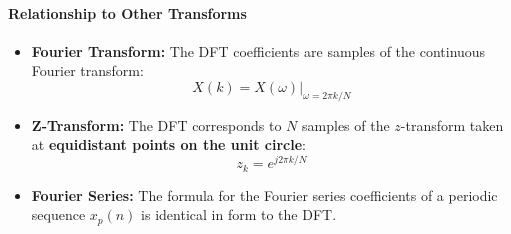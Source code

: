 \hypertarget{relationship-to-other-transforms}{%
\paragraph{Relationship to Other
Transforms}\label{relationship-to-other-transforms}}

\begin{itemize}
\tightlist
\item
  \textbf{Fourier Transform:} The DFT coefficients are samples of the
  continuous Fourier transform:
  \[X(k) = X(\omega)|_{\omega = 2\pi k/N}\]
\item
  \textbf{Z-Transform:} The DFT corresponds to \(N\) samples of the
  \(z\)-transform taken at \textbf{equidistant points on the unit
  circle}: \[z_k = e^{j2\pi k/N}\]
\item
  \textbf{Fourier Series:} The formula for the Fourier series
  coefficients of a periodic sequence \(x_p(n)\) is identical in form to
  the DFT.
\end{itemize}

